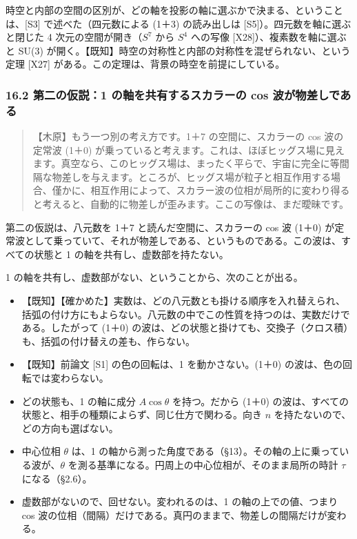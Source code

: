 \documentclass[
  a4paper,
]{ltjsarticle}
\providecommand{\tightlist}{%
  \setlength{\itemsep}{0pt}\setlength{\parskip}{0pt}}
\begin{document}
時空と内部の空間の区別が、どの軸を投影の軸に選ぶかで決まる、ということは、{[}S3{]}
で述べた（四元数による (1＋3) の読み出しは
{[}S5{]}）。四元数を軸に選ぶと閉じた 4 次元の空間が開き（\(S^7\) から
\(S^4\) への写像 {[}X28{]}）、複素数を軸に選ぶと SU(3)
が開く。【既知】時空の対称性と内部の対称性を混ぜられない、という定理
{[}X27{]} がある。この定理は、背景の時空を前提にしている。

\subsubsection{16.2 第二の仮説：1 の軸を共有するスカラーの cos
波が物差しである}\label{ux7b2cux4e8cux306eux4eeeux8aac1-ux306eux8ef8ux3092ux5171ux6709ux3059ux308bux30b9ux30abux30e9ux30fcux306e-cos-ux6ce2ux304cux7269ux5deeux3057ux3067ux3042ux308b}

\begin{quote}
【木原】もう一つ別の考え方です。1＋7 の空間に、スカラーの cos 波の定常波
(1＋0)
が乗っていると考えます。これは、ほぼヒッグス場に見えます。真空なら、このヒッグス場は、まったく平らで、宇宙に完全に等間隔な物差しを与えます。ところが、ヒッグス場が粒子と相互作用する場合、僅かに、相互作用によって、スカラー波の位相が局所的に変わり得ると考えると、自動的に物差しが歪みます。ここの写像は、まだ曖昧です。
\end{quote}

第二の仮説は、八元数を 1＋7 と読んだ空間に、スカラーの cos 波 (1＋0)
が定常波として乗っていて、それが物差しである、というものである。この波は、すべての状態と
1 の軸を共有し、虚数部を持たない。

1 の軸を共有し、虚数部がない、ということから、次のことが出る。

\begin{itemize}
\tightlist
\item
  【既知】【確かめた】実数は、どの八元数とも掛ける順序を入れ替えられ、括弧の付け方にもよらない。八元数の中でこの性質を持つのは、実数だけである。したがって
  (1＋0)
  の波は、どの状態と掛けても、交換子（クロス積）も、括弧の付け替えの差も、作らない。
\item
  【既知】前論文 {[}S1{]} の色の回転は、1 を動かさない。(1＋0)
  の波は、色の回転では変わらない。
\item
  どの状態も、1 の軸に成分 \(A\cos\theta\) を持つ。だから (1＋0)
  の波は、すべての状態と、相手の種類によらず、同じ仕方で関わる。向き
  \(n\) を持たないので、どの方向も選ばない。
\item
  中心位相 \(\theta\) は、1
  の軸から測った角度である（§13）。その軸の上に乗っている波が、\(\theta\)
  を測る基準になる。円周上の中心位相が、そのまま局所の時計 \(\tau\)
  になる（§2.6）。
\item
  虚数部がないので、回せない。変われるのは、1 の軸の上での値、つまり cos
  波の位相（間隔）だけである。真円のままで、物差しの間隔だけが変わる。
\end{itemize}
\end{document}

